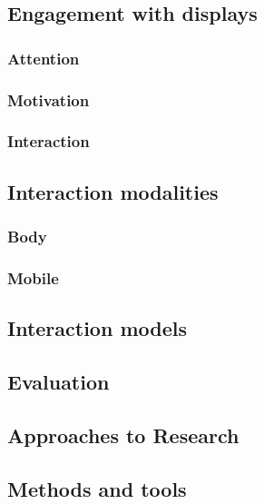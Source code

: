 \subsection{Engagement with displays}
\subsubsection{Attention}
\subsubsection{Motivation}
\subsubsection{Interaction}

\subsection{Interaction modalities}
\subsubsection{Body}
\subsubsection{Mobile}

\subsection{Interaction models}

\subsection{Evaluation}

\subsection{Approaches to Research}
\subsection{Methods and tools}







 





